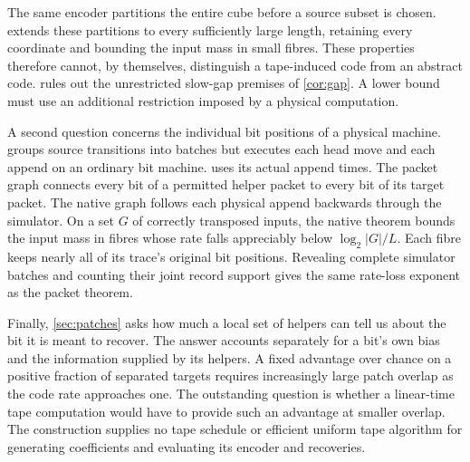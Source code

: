 The same encoder partitions the entire cube before a source subset is
chosen.  extends these partitions to every
sufficiently large length, retaining every coordinate and bounding the
input mass in small fibres. These properties therefore cannot, by
themselves, distinguish a tape-induced code from an abstract code.
 rules out the unrestricted slow-gap premises of
\cref{cor:gap}. A lower bound must use an additional restriction imposed
by a physical computation.

A second question concerns the individual bit positions of a physical
machine.  groups source transitions into batches but
executes each head move and each append on an ordinary bit machine.
 uses its actual append times. The packet graph connects every bit of a permitted helper packet to
every bit of its target packet. The native graph follows each physical
append backwards through the simulator. On a set $G$ of correctly
transposed inputs, the native theorem bounds the input mass in fibres
whose rate falls appreciably below $\log_2|G|/L$. Each fibre keeps nearly
all of its trace's original bit positions. Revealing complete simulator batches and counting their joint record
support gives the same rate-loss exponent as the packet theorem.

Finally, \cref{sec:patches} asks how much a local set of helpers can tell
us about the bit it is meant to recover. The answer accounts separately
for a bit's own bias and the information supplied by its helpers. A
fixed advantage over chance on a positive fraction of separated targets
requires increasingly large patch overlap as the code rate approaches
one. The outstanding question is whether a linear-time tape computation
would have to provide such an advantage at smaller overlap. The
construction supplies no tape schedule or efficient uniform tape
algorithm for generating coefficients and evaluating its encoder and
recoveries.

